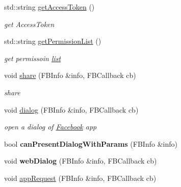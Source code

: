 \begin{DoxyCompactItemize}
\mbox{\label{classcocos2d_1_1plugin_1_1FacebookAgent_a31095efeb38d4b5fa97ae21a9bab45c3}} 
std\+::string \hyperlink{classcocos2d_1_1plugin_1_1FacebookAgent_a31095efeb38d4b5fa97ae21a9bab45c3}{get\+Access\+Token} ()
\begin{DoxyCompactList}\small\item\em get Access\+Token \end{DoxyCompactList}\item 
\mbox{\label{classcocos2d_1_1plugin_1_1FacebookAgent_ac9f19dc11d1d8ca95a1fc451db1e5ff7}} 
std\+::string \hyperlink{classcocos2d_1_1plugin_1_1FacebookAgent_ac9f19dc11d1d8ca95a1fc451db1e5ff7}{get\+Permission\+List} ()
\begin{DoxyCompactList}\small\item\em get permissoin \hyperlink{protocollist-p}{list} \end{DoxyCompactList}\item 
void \hyperlink{classcocos2d_1_1plugin_1_1FacebookAgent_aff75e3af70dfc31c20c32d8545cd5606}{share} (F\+B\+Info \&info, F\+B\+Callback cb)
\begin{DoxyCompactList}\small\item\em share \end{DoxyCompactList}\item 
void \hyperlink{classcocos2d_1_1plugin_1_1FacebookAgent_a7eb8857da590bc99adbff85d215f89a7}{dialog} (F\+B\+Info \&info, F\+B\+Callback cb)
\begin{DoxyCompactList}\small\item\em open a dialog of \hyperlink{interfaceFacebook}{Facebook} app \end{DoxyCompactList}\item 
\mbox{\label{classcocos2d_1_1plugin_1_1FacebookAgent_a6785d0a031bc6288c443c6b6f7ce7713}} 
bool {\bfseries can\+Present\+Dialog\+With\+Params} (F\+B\+Info \&info)
\item 
\mbox{\label{classcocos2d_1_1plugin_1_1FacebookAgent_a0ecd7eb83a63d09f7397743b2a30c3ed}} 
void {\bfseries web\+Dialog} (F\+B\+Info \&info, F\+B\+Callback cb)
\item 
void \hyperlink{classcocos2d_1_1plugin_1_1FacebookAgent_acac5e1598401ab20026c28e56a9b74a7}{app\+Request} (F\+B\+Info \&info, F\+B\+Callback cb)

\end{DoxyCompactItemize}
